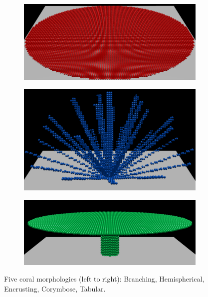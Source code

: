 \documentclass[9pt]{pnas-new}
\begin{document}
\begin{figure}[H]
    \begin{subfigure}{0.12\textwidth}
        \includegraphics[width=\textwidth]{fig/encrusting.png}
    \end{subfigure}
    \begin{subfigure}{0.12\textwidth}
        \includegraphics[width=\textwidth]{fig/corymbose.png}
    \end{subfigure}
    \begin{subfigure}{0.12\textwidth}
        \includegraphics[width=\textwidth]{fig/tabular.png}
    \end{subfigure}
    \caption{Five coral morphologies (left to right): Branching, Hemispherical, Encrusting, Corymbose, Tabular.}
    \label{fig:morphologies}
\end{figure}
\end{document}
